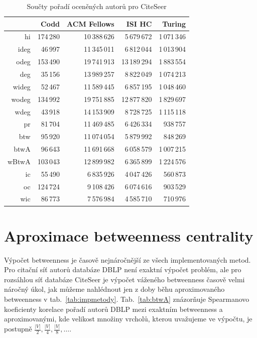 \documentclass{bakalarka}
\begin{document}
\begin{table}[!ht]
\centering
\caption{Součty pořadí oceněných autorů pro CiteSeer}
\label{tab:oceneni2}
\begin{tabular}{r|rrrr}
\toprule
&Codd & ACM Fellows & ISI HC  & Turing \\
\midrule
hi   &174\,280&10\,388\,626& 5\,679\,672&1\,071\,346 \\
ideg & 46\,997&11\,345\,011& 6\,812\,044&1\,013\,904 \\
odeg &153\,490&19\,741\,913&13\,189\,294&1\,883\,554 \\
deg  & 35\,156&13\,989\,257& 8\,822\,049&1\,074\,213 \\
wideg& 52\,467&11\,589\,445& 6\,857\,195&1\,048\,460 \\
wodeg&134\,992&19\,751\,885&12\,877\,820&1\,829\,697\\
wdeg & 43\,918&14\,153\,909& 8\,728\,725&1\,115\,118\\
pr   & 81\,704&11\,469\,485& 6\,426\,334&   938\,757\\
btw  & 95\,920&11\,074\,054& 5\,879\,992&   848\,269\\
btwA & 96\,643&11\,691\,668& 6\,058\,579&1\,007\,215\\
wBtwA&103\,043&12\,899\,982& 6\,365\,899&1\,224\,576\\
\midrule
ic\footnotemark[1]  &55\,490 &6\,835\,926&4\,047\,426&560\,873\\
oc\footnotemark[1]  &124\,724&9\,108\,426&6\,074\,616&903\,529\\
wic\footnotemark[1] &86\,773 &7\,576\,984&4\,585\,710&710\,976\\
\bottomrule
\end{tabular}
\end{table}


\clearpage
\section{Aproximace betweenness centrality}
Výpočet betweenness je časově nejnáročnější ze všech implementovaných metod.
Pro citační síť autorů databáze DBLP není exaktní výpočet problém, ale pro
rozsáhlou síť databáze CiteSeer je výpočet váženého betweenness časově velmi
náročný úkol, jak můžeme nahlédnout jen z doby běhu aproximovaného betweenness
v tab.~\ref{tab:impmetody}. Tab.~\ref{tab:btwA} znázorňuje Spearmanovo
koeficienty korelace pořadí autorů DBLP mezi exaktním betweenness a
aproximovanými, kde velikost množiny vrcholů, kterou uvažujeme ve výpočtu, je
postupně $\frac{|V|}{2}, \frac{|V|}{4}, \frac{|V|}{8}, \ldots$.
\end{document}
